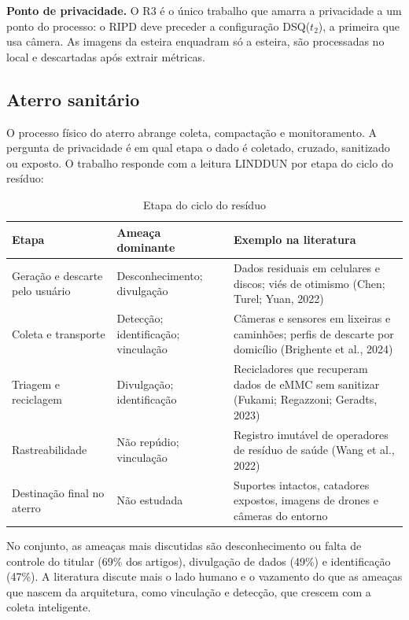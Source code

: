 \documentclass[12pt,a4paper,article,oneside,english,brazil]{abntex2}
\newcommand{\fontetab}[1]{\par\vspace{3pt}{\small\noindent Fonte: #1\par}}
\newcommand{\dsq}[1]{DSQ($t_{#1}$)}
\begin{document}
\textbf{Ponto de privacidade.} O R3 é o único trabalho que amarra a privacidade a um ponto do processo: o RIPD deve preceder a configuração \dsq{2}, a primeira que usa câmera. As imagens da esteira enquadram só a esteira, são processadas no local e descartadas após extrair métricas.

\subsection{Aterro sanitário}

O processo físico do aterro abrange coleta, compactação e monitoramento. A pergunta de privacidade é em qual etapa o dado é coletado, cruzado, sanitizado ou exposto. O trabalho responde com a leitura LINDDUN por etapa do ciclo do resíduo:

\begin{table}[!htbp]
\centering
\caption{Etapa do ciclo do resíduo}
\label{tab:etapas}
\small
\begin{tabularx}{\linewidth}{>{\raggedright\arraybackslash}p{3.4cm} >{\raggedright\arraybackslash}p{3.4cm} Y}
\hline
\textbf{Etapa} & \textbf{Ameaça dominante} & \textbf{Exemplo na literatura}\\
\hline
Geração e descarte pelo usuário & Desconhecimento; divulgação & Dados residuais em celulares e discos; viés de otimismo (Chen; Turel; Yuan, 2022)\\
Coleta e transporte & Detecção; identificação; vinculação & Câmeras e sensores em lixeiras e caminhões; perfis de descarte por domicílio (Brighente et al., 2024)\\
Triagem e reciclagem & Divulgação; identificação & Recicladores que recuperam dados de eMMC sem sanitizar (Fukami; Regazzoni; Geradts, 2023)\\
Rastreabilidade & Não repúdio; vinculação & Registro imutável de operadores de resíduo de saúde (Wang et al., 2022)\\
Destinação final no aterro & Não estudada & Suportes intactos, catadores expostos, imagens de drones e câmeras do entorno\\
\hline
\end{tabularx}
\fontetab{Elaborado pelo autor (2026).}
\end{table}

No conjunto, as ameaças mais discutidas são desconhecimento ou falta de controle do titular (69\% dos artigos), divulgação de dados (49\%) e identificação (47\%). A literatura discute mais o lado humano e o vazamento do que as ameaças que nascem da arquitetura, como vinculação e detecção, que crescem com a coleta inteligente.
\end{document}
